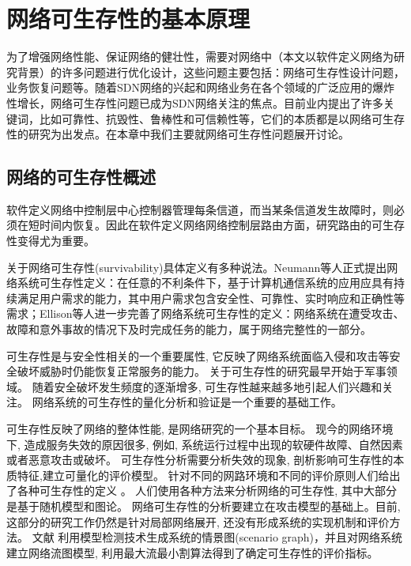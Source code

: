 
\chapter{网络可生存性的基本原理}
为了增强网络性能、保证网络的健壮性，需要对网络中（本文以软件定义网络为研究背景）的许多问题进行优化设计，这些问题主要包括：网络可生存性设计问题，业务恢复问题等。随着SDN网络的兴起和网络业务在各个领域的广泛应用的爆炸性增长，网络可生存性问题已成为SDN网络关注的焦点。目前业内提出了许多关键词，比如可靠性、抗毁性、鲁棒性和可信赖性等，它们的本质都是以网络可生存性的研究为出发点。在本章中我们主要就网络可生存性问题展开讨论。



\section{网络的可生存性概述}
软件定义网络中控制层中心控制器管理每条信道，而当某条信道发生故障时，则必须在短时间内恢复。因此在软件定义网络网络控制层路由方面，研究路由的可生存性变得尤为重要。

关于网络可生存性(survivability)具体定义有多种说法\cite{al2009comparative}。Neumann\cite{hollway1993survivable}等人正式提出网络系统可生存性定义：在任意的不利条件下，基于计算机通信系统的应用应具有持续满足用户需求的能力，其中用户需求包含安全性、可靠性、实时响应和正确性等需求；Ellison\cite{ellison1997survivable}等人进一步完善了网络系统可生存性的定义：网络系统在遭受攻击、故障和意外事故的情况下及时完成任务的能力，属于网络完整性的一部分。


可生存性是与安全性相关的一个重要属性, 它反映了网络系统面临入侵和攻击等安全破坏威胁时仍能恢复正常服务的能力\cite{jha2000survivability}。 关于可生存性的研究最早开始于军事领域\cite{frank1974survivability}。 随着安全破坏发生频度的逐渐增多, 可生存性越来越多地引起人们兴趣和关注。 网络系统的可生存性的量化分析和验证是一个重要的基础工作。


可生存性反映了网络的整体性能, 是网络研究的一个基本目标。 现今的网络环境下, 造成服务失效的原因很多, 例如, 系统运行过程中出现的软硬件故障、自然因素或者恶意攻击或破坏。 可生存性分析需要分析失效的现象, 剖析影响可生存性的本质特征,建立可量化的评价模型。 针对不同的网路环境和不同的评价原则人们给出了各种可生存性的定义\cite{zolfaghari1994framework,liew1994framework,knight2000definition} 。 人们使用各种方法来分析网络的可生存性, 其中大部分是基于随机模型和图论。 网络可生存性的分析要建立在攻击模型的基础上。目前, 这部分的研究工作仍然是针对局部网络展开, 还没有形成系统的实现机制和评价方法。 文献\cite{frank1974survivability} 利用模型检测技术生成系统的情景图(scenario graph)，并且对网络系统建立网络流图模型, 利用最大流最小割算法得到了确定可生存性的评价指标。


